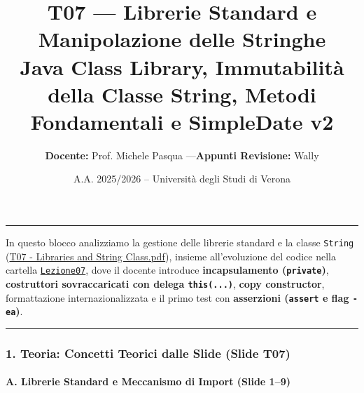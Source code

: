 \documentclass[11pt,a4paper]{article}
\title{\Huge\bfseries\sffamily\color{brandblue} T07 --- Librerie Standard e Manipolazione delle Stringhe \\[0.3em] \large\sffamily Java Class Library, Immutabilità della Classe String, Metodi Fondamentali e SimpleDate v2}
\author{\textbf{Docente:} Prof. Michele Pasqua \quad---\quad \textbf{Appunti Revisione:} Wally}
\date{A.A. 2025/2026 -- Universit\`a degli Studi di Verona}
\newcommand{\passthrough}[1]{#1}
\begin{document}
\maketitle
\thispagestyle{fancy}
\vspace{-1.2em}
\noindent\textcolor{brandblue}{\rule{\textwidth}{0.8pt}}
\vspace{1.2em}

In questo blocco analizziamo la gestione delle librerie standard e la
classe \passthrough{\lstinline!String!}
(\href{file:///home/wally/Documenti/GitHub/Programmazione-II/25-26/Teoria-e-Esercitazioni/Slides-20260902/T07\%20-\%20Libraries\%20and\%20String\%20Class.pdf}{T07
- Libraries and String Class.pdf}), insieme all'evoluzione del codice
nella cartella
\href{file:///home/wally/Documenti/GitHub/Programmazione-II/25-26/Teoria-e-Esercitazioni/Codice-20260902/Lezione07/SimpleDate}{\passthrough{\lstinline!Lezione07!}},
dove il docente introduce \textbf{incapsulamento
(\passthrough{\lstinline!private!})}, \textbf{costruttori sovraccaricati
con delega \passthrough{\lstinline!this(...)!}}, \textbf{copy
constructor}, formattazione internazionalizzata e il primo test con
\textbf{asserzioni (\passthrough{\lstinline!assert!} e flag
\passthrough{\lstinline!-ea!})}.

\begin{center}\rule{0.5\linewidth}{0.5pt}\end{center}

\subsubsection{1. Teoria: Concetti Teorici dalle Slide (Slide
T07)}\label{teoria-concetti-teorici-dalle-slide-slide-t07}

\paragraph{A. Librerie Standard e Meccanismo di Import (Slide
1--9)}\label{a.-librerie-standard-e-meccanismo-di-import-slide-19}
\end{document}
